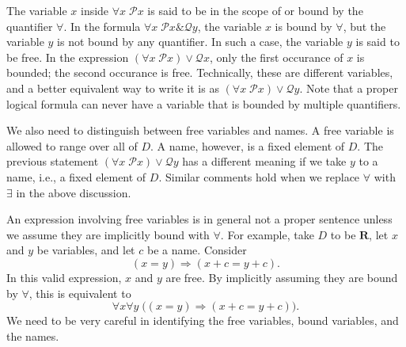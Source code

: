 \documentclass[a4paper,11pt]{article}
\newcommand{\R}{\mathbf{R}}
\newcommand{\PP}{\mathscr{P}}
\newcommand{\QQ}{\mathscr{Q}}
\begin{document}
The variable $x$ inside $\forall x\;\PP x$ is said to be in the scope of or
bound by the quantifier $\forall$. In the formula $\forall x\;\PP x\&\QQ y$, the
variable $x$ is bound by $\forall$, but the variable $y$ is not bound by any
quantifier. In such a case, the variable $y$ is said to be free. In the
expression $(\forall x\;\PP x)\vee\QQ x$, only the first occurance of $x$ is
bounded; the second occurance is free. Technically, these are different
variables, and a better equivalent way to write it is as $(\forall x\;\PP x)\vee
\QQ y$. Note that a proper logical formula can never have a variable that is
bounded by multiple quantifiers.

We also need to distinguish between free variables and names. A free variable is
allowed to range over all of $D$. A name, however, is a fixed element of $D$.
The previous statement $(\forall x\;\PP x)\vee\QQ y$ has a different meaning if
we take $y$ to a name, i.e., a fixed element of $D$. Similar comments hold when
we replace $\forall$ with $\exists$ in the above discussion.

An expression involving free variables is in general not a proper sentence
unless we assume they are implicitly bound with $\forall$. For example, take $D$
to be $\R$, let $x$ and $y$ be variables, and let $c$ be a name. Consider
\[
  (x=y) \Rightarrow (x+c = y+c).
\]
In this valid expression, $x$ and $y$ are free. By implicitly assuming they are
bound by $\forall$, this is equivalent to
\[
  \forall x\forall y\;\Big( (x=y) \Rightarrow (x+c = y+c) \Big).
\]
We need to be very careful in identifying the free variables, bound variables,
and the names.
\end{document}
